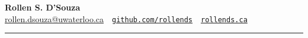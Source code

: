 \documentclass[oneside, 10pt]{memoir}
\begin{document}
%

{\LARGE\textbf{Rollen S. D'Souza}}\\
{\small\url{rollen.dsouza@uwaterloo.ca}~\textbullet~\href{https://github.com/rollends}{\texttt{github.com/rollends}}~\textbullet~\href{https://rollends.ca}{\texttt{rollends.ca}} }\\
\rule{\linewidth}{0.4pt}


\end{document}
